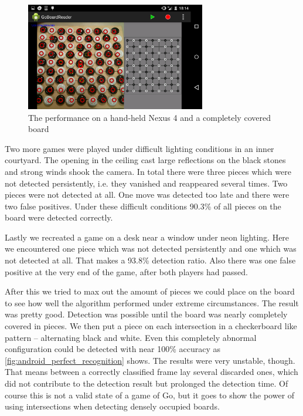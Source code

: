 	\begin{figure}[h!]
		\center
		\includegraphics[width=0.7\textwidth]{images/android_perfect_recognition.png}
		\caption{The performance on a hand-held Nexus 4 and a completely covered board}
		\label{fig:android_perfect_recognition}
	\end{figure}
	Two more games were played under difficult lighting conditions in an inner courtyard. The opening in the ceiling cast large reflections on the black stones and strong winds shook the camera. In total there were three pieces which were not detected persistently, i.e. they vanished and reappeared several times. Two pieces were not detected at all. One move was detected too late and there were two false positives. Under these difficult conditions 90.3\% of all pieces on the board were detected correctly.

	Lastly we recreated a game on a desk near a window under neon lighting. Here we encountered one piece which was not detected persistently and one which was not detected at all. That makes a 93.8\% detection ratio. Also there was one false positive at the very end of the game, after both players had passed.

	After this we tried to max out the amount of pieces we could place on the board to see how well the algorithm performed under extreme circumstances. The result was pretty good. Detection was possible until the board was nearly completely covered in pieces. We then put a piece on each intersection in a checkerboard like pattern -- alternating black and white. Even this completely abnormal configuration could be detected with near 100\% accuracy as \autoref{fig:android_perfect_recognition} shows. The results were very unstable, though. That means between a correctly classified frame lay several discarded ones, which did not contribute to the detection result but prolonged the detection time. Of course this is not a valid state of a game of Go, but it goes to show the power of using intersections when detecting densely occupied boards.
